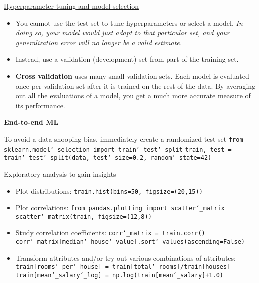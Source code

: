 \underline{Hyperparameter tuning and model selection}
\begin{itemize}
\vspace{-3.0mm}
\item
You cannot use the test set to tune hyperparameters or select a model.\newline
\textit{In doing so, your model would just adapt to that particular set,
and your generalization error will no longer be a valid estimate.}
\item
Instead, use a validation (development) set from part of the training set.
\item
\textbf{Cross validation} uses many small validation sets.
Each model is evaluated once per validation set after it is trained on the rest of the data.
By averaging out all the evaluations of a model,
you get a much more accurate measure of its performance.
\end{itemize}



\newpage
\textbf{End-to-end ML}

To avoid a data snooping bias, immediately create a randomized test set\newline
\texttt{from sklearn.model\char`_selection import train\char`_test\char`_split}\newline
\texttt{train, test = train\char`_test\char`_split(data, test\char`_size=0.2, random\char`_state=42)}\newline

Exploratory analysis to gain insights
\begin{itemize}
\vspace{-3.0mm}
\item
Plot distributions:\newline
\texttt{train.hist(bins=50, figsize=(20,15))} 
\item
Plot correlations:\newline
\texttt{from pandas.plotting import scatter\char`_matrix}\newline
\texttt{scatter\char`_matrix(train, figsize=(12,8))}
\item
Study correlation coefficients:\newline
\texttt{corr\char`_matrix = train.corr()}\newline
\texttt{corr\char`_matrix[\textquotesingle median\char`_house\char`_value\textquotesingle].sort\char`_values(ascending=False)}
\item
Transform attributes and/or try out various combinations of attributes:\newline
\texttt{train[\textquotesingle rooms\char`_per\char`_house\textquotesingle] = train[\textquotesingle total\char`_rooms\textquotesingle]/train[\textquotesingle houses\textquotesingle]}\newline
\texttt{train[\textquotesingle mean\char`_salary\char`_log\textquotesingle] = np.log(train[\textquotesingle mean\char`_salary\textquotesingle]+1.0)}
\end{itemize}


